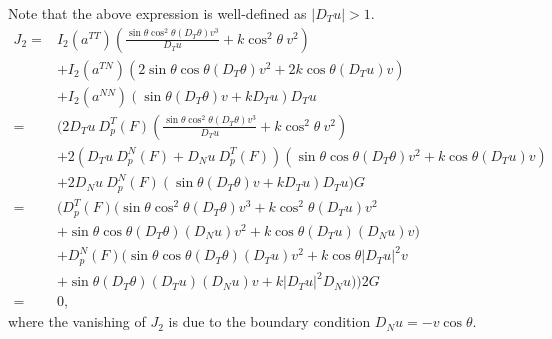 \documentclass[12pt]{article}
\numberwithin{equation}{section}
\theoremstyle{plain}
\theoremstyle{definition}
\theoremstyle{remark}
\begin{document}
Note that the above expression is well-defined as $|D_Tu| > 1$.
\begin{equation} \label{eq:ang_J2}
    \begin{split}
        J_2 = & I_2(a^{TT}) \left(\frac{ \sin{\theta} \cos^2\theta (D_T \theta) v^3 }{D_T u} + k \cos^2\theta \  v^2 \right) \\ 
        & + I_2(a^{TN}) \left(2\sin{\theta} \cos{\theta} (D_T \theta) v^2 + 2k \cos{\theta} (D_T u) v \right) \\
        & + I_2(a^{NN}) \left(\sin{\theta} (D_T \theta) v + k D_T u \right) D_T u \\
        = & \Bigg( 2 D_T u\ D^T_p (F)  \left(\frac{ \sin{\theta} \cos^2\theta (D_T \theta) v^3 }{D_T u} + k \cos^2\theta \ v^2 \right)  \\  
        & + 2 \left(D_T u\ D^N_p (F) + D_N u\ D^T_p (F) \right) \left( \sin{\theta} \cos{\theta} (D_T \theta) v^2 + k \cos{\theta} (D_T u) v \right)  \\
        & + 2 D_N u\ D^N_p (F) \left(\sin{\theta} (D_T \theta) v + k D_T u \right) D_T u    \Bigg) G \\
        = & \Bigg(  D^T_p (F) \Big(\sin{\theta} \cos^2\theta (D_T \theta) v^3 + k \cos^2\theta (D_T u) v^2 \\ 
        &+ \sin{\theta} \cos{\theta} (D_T \theta) (D_N u) v^2 + k \cos{\theta} (D_T u) (D_N u) v  \Big) \\
        & + D^N_p (F) \Big( \sin{\theta} \cos{\theta} (D_T \theta) (D_T u) v^2 + k \cos{\theta} |D_T u|^2 v \\  
        & + \sin{\theta} (D_T \theta) (D_T u) (D_N u) v +  k |D_T u|^2 D_N u  \Big) \Bigg) 2G \\
        = & 0,
    \end{split}
\end{equation}
where the vanishing of $J_2$ is due to the boundary condition
$D_N u= -v\cos{\theta}$.
\end{document}
